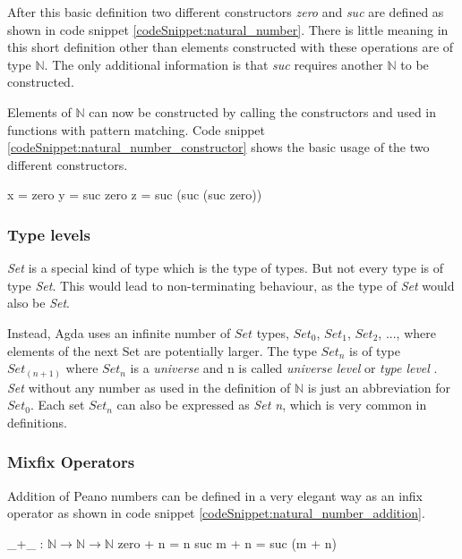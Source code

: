 After this basic definition two different constructors \emph{zero} and \emph{suc} are defined as shown in code snippet \ref{codeSnippet:natural_number}.
There is little meaning in this short definition other than elements constructed with these operations are of type $\mathbb{N}$.
The only additional information is that \emph{suc} requires another $\mathbb{N}$ to be constructed.

Elements of $\mathbb{N}$ can now be constructed by calling the constructors and used in functions with pattern matching. 
Code snippet \ref{codeSnippet:natural_number_constructor} shows the basic usage of the two different constructors.

\begin{codesnippet}[mathescape=true, caption={Some peano numbers}, label={codeSnippet:natural_number_constructor}]
x = zero
y = suc zero
z = suc (suc (suc zero))
\end{codesnippet}

\subsubsection{Type levels}
\emph{Set} is a special kind of type which is the type of types.
But not every type is of type \emph{Set}. 
This would lead to non-terminating behaviour, as the type of \emph{Set} would also be \emph{Set}.

Instead, Agda uses an infinite number of $Set$ types, $Set_0$, $Set_1$, $Set_2$, ..., where elements of the next Set are potentially larger.
The type $Set_n$ is of type $Set_{(n+1)}$ where $Set_n$ is a \emph{universe} and n is called \emph{universe level} or \emph{type level} \cite{AgdaReadTheDocs, 10.1145/2841316}.
\emph{Set} without any number as used in the definition of $\mathbb{N}$ is just an abbreviation for $Set_0$. 
Each set $Set_n$ can also be expressed as \emph{Set n}, which is very common in definitions.

\subsubsection{Mixfix Operators}
Addition of Peano numbers can be defined in a very elegant way as an infix operator as shown in code snippet \ref{codeSnippet:natural_number_addition}.

\begin{codesnippet}[mathescape=true, caption={Peano numbers addition}, label={codeSnippet:natural_number_addition}]
_+_ : $\mathbb{N} \rightarrow \mathbb{N} \rightarrow \mathbb{N}$
zero  + n = n
suc m + n = suc (m + n)
\end{codesnippet}

